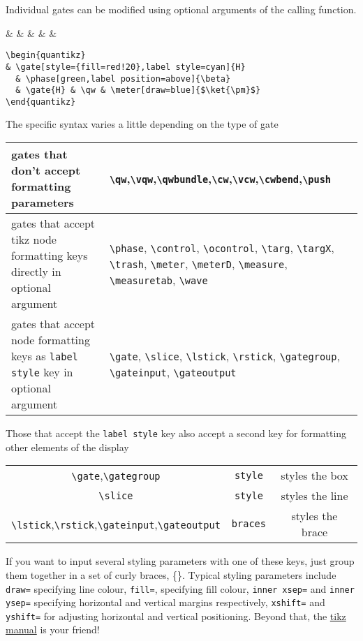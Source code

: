 \documentclass[aps,pra,10pt,nofootinbib]{revtex4}
\begin{document}
Individual gates can be modified using optional arguments of the calling function. 
\begin{Code}
\begin{center}
\begin{quantikz}
&  & \phase[green,label position=above]{\beta} &  & \qw & \meter[draw=blue]{$\ket{\pm}$}
\end{quantikz}
\end{center}
\tcblower
\begin{lstlisting}
\begin{quantikz}
& \gate[style={fill=red!20},label style=cyan]{H} 
  & \phase[green,label position=above]{\beta} 
  & \gate{H} & \qw & \meter[draw=blue]{$\ket{\pm}$}
\end{quantikz}
\end{lstlisting}
\end{Code}
The specific syntax varies a little depending on the type of gate
\begin{center}
\begin{tabular}{p{}|p{}}
gates that don't accept formatting parameters & \verb!\qw!,\verb!\vqw!,\verb!\qwbundle!,\verb!\cw!,\verb!\vcw!,\verb!\cwbend!,\verb!\push!	\\
\hline
gates that accept tikz node formatting keys directly in optional argument & \verb!\phase!, \verb!\control!, \verb!\ocontrol!, \verb!\targ!, \verb!\targX!, \verb!\trash!, \verb!\meter!, \verb!\meterD!, \verb!\measure!, \verb!\measuretab!, \verb!\wave! \\
\hline
gates that accept node formatting keys as \verb!label style! key in optional argument & \verb!\gate!, \verb!\slice!, \verb!\lstick!, \verb!\rstick!, \verb!\gategroup!, \verb!\gateinput!, \verb!\gateoutput!
\end{tabular}
\end{center}
Those that accept the \verb!label style! key also accept a second key for formatting other elements of the display
\begin{center}
\begin{tabular}{c|cc}
\verb!\gate!,\verb!\gategroup! & \verb!style! & styles the box	\\
\verb!\slice! & \verb!style! & styles the line\\
\verb!\lstick!,\verb!\rstick!,\verb!\gateinput!,\verb!\gateoutput! & \verb!braces! & styles the brace
\end{tabular}
\end{center}
If you want to input several styling parameters with one of these keys, just group them together in a set of curly braces, \{\}. Typical styling parameters include \verb!draw=! specifying line colour, \verb!fill=!, specifying fill colour, \verb!inner xsep=! and \verb!inner ysep=! specifying horizontal and vertical margins respectively, \verb!xshift=! and \verb!yshift=! for adjusting horizontal and vertical positioning. Beyond that, the \href{http://mirrors.ctan.org/graphics/pgf/base/doc/pgfmanual.pdf}{tikz manual} is your friend!
\end{document}
